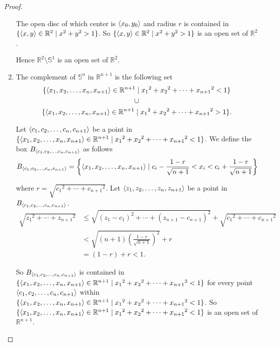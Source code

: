 \begin{proof}
\begin{enumerate}[label={(\roman*)}]
		      The open disc of which center is $\left\langle{x_{0}, y_{0}}\right\rangle$ and radius $r$ is contained in $\{ \left\langle{x, y}\right\rangle\in\mathbb{R}^{2} \mid x^{2} + y^{2} > 1 \}$. So $\{ \left\langle{x, y}\right\rangle\in\mathbb{R}^{2} \mid x^{2} + y^{2} > 1 \}$ is an open set of $\mathbb{R}^{2}$.

		      Hence $\mathbb{R}^{2}\setminus \mathbb{S}^{1}$ is an open set of $\mathbb{R}^{2}$.
		\item The complement of $\mathbb{S}^{n}$ in $\mathbb{R}^{n+1}$ is the following set
		      \begin{multline*}
			      \{ \left\langle{x_{1}, x_{2}, \ldots, x_{n}, x_{n+1}}\right\rangle \in \mathbb{R}^{n+1} \mid {x_{1}}^{2} + {x_{2}}^{2} + \cdots + {x_{n+1}}^{2} < 1 \} \\
			      \cup \\
			      \{ \left\langle{x_{1}, x_{2}, \ldots, x_{n}, x_{n+1}}\right\rangle \in \mathbb{R}^{n+1} \mid {x_{1}}^{2} + {x_{2}}^{2} + \cdots + {x_{n+1}}^{2} > 1 \}.
		      \end{multline*}

		      Let $\left\langle{c_{1}, c_{2}, \ldots, c_{n}, c_{n+1}}\right\rangle$ be a point in $\{ \left\langle{x_{1}, x_{2}, \ldots, x_{n}, x_{n+1}}\right\rangle \in \mathbb{R}^{n+1} \mid {x_{1}}^{2} + {x_{2}}^{2} + \cdots + {x_{n+1}}^{2} < 1 \}$. We define the box $B_{\left\langle{c_{1}, c_{2}, \ldots, c_{n}, c_{n+1}}\right\rangle}$ as follows
		      \[
			      B_{\left\langle{c_{1}, c_{2}, \ldots, c_{n}, c_{n+1}}\right\rangle} = \left\{ \left\langle{x_{1}, x_{2}, \ldots, x_{n}, x_{n+1}}\right\rangle \mid c_{i} - \frac{1-r}{\sqrt{n+1}} < x_{i} < c_{i} + \frac{1-r}{\sqrt{n+1}} \right\}
		      \]

		      where $r = \sqrt{{c_{1}}^{2} + \cdots + {c_{n+1}}^{2}}$. Let $\left\langle{z_{1}, z_{2}, \ldots, z_{n}, z_{n+1}}\right\rangle$ be a point in $B_{\left\langle{c_{1}, c_{2}, \ldots, c_{n}, c_{n+1}}\right\rangle}$.
		      \begin{align*}
			      \sqrt{{z_{1}}^{2} + \cdots+ {z_{n+1}}^{2}} & \leq \sqrt{{(z_{1} - c_{1})}^{2} + \cdots + {(z_{n+1} - c_{n+1})}^{2}} + \sqrt{{c_{1}}^{2} + \cdots + {c_{n+1}}^{2}} \\
			                                                 & < \sqrt{(n+1){\left(\frac{1-r}{\sqrt{n+1}}\right)}^{2}} + r                                                          \\
			                                                 & = (1 - r) + r < 1.
		      \end{align*}

		      So $B_{\left\langle{c_{1}, c_{2}, \ldots, c_{n}, c_{n+1}}\right\rangle}$ is contained in $\{ \left\langle{x_{1}, x_{2}, \ldots, x_{n}, x_{n+1}}\right\rangle \in \mathbb{R}^{n+1} \mid {x_{1}}^{2} + {x_{2}}^{2} + \cdots + {x_{n+1}}^{2} < 1 \}$ for every point $\left\langle{c_{1}, c_{2}, \ldots, c_{n}, c_{n+1}}\right\rangle$ within $\{ \left\langle{x_{1}, x_{2}, \ldots, x_{n}, x_{n+1}}\right\rangle \in \mathbb{R}^{n+1} \mid {x_{1}}^{2} + {x_{2}}^{2} + \cdots + {x_{n+1}}^{2} < 1 \}$. So $\{ \left\langle{x_{1}, x_{2}, \ldots, x_{n}, x_{n+1}}\right\rangle \in \mathbb{R}^{n+1} \mid {x_{1}}^{2} + {x_{2}}^{2} + \cdots + {x_{n+1}}^{2} < 1 \}$ is an open set of $\mathbb{R}^{n+1}$.


\end{enumerate}
\end{proof}
